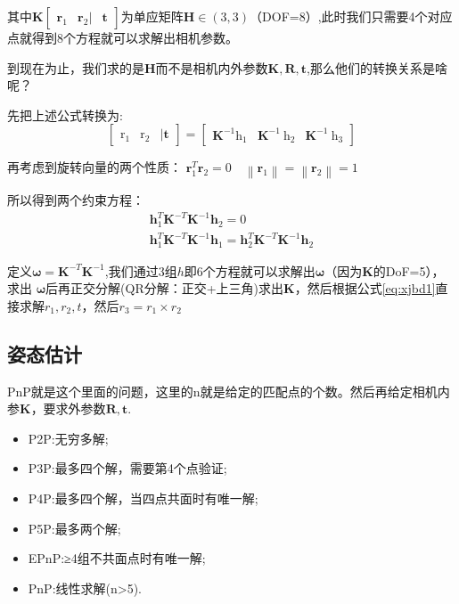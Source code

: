 \documentclass[12pt]{article}
\begin{document}
其中$\mathbf{K}\left[\begin{array}{lll}
    \mathbf{r}_{1} & \mathbf{r}_{2}| & \mathbf{t}
    \end{array}\right]$为单应矩阵$\mathbf{H}\in(3,3)$（DOF=8）,此时我们只需要4个对应点就得到8个方程就可以求解出相机参数。

到现在为止，我们求的是$\mathbf{H}$而不是相机内外参数$\mathbf{K,R,t}$,那么他们的转换关系是啥呢？

先把上述公式转换为:
\begin{equation}
    \label{eq:xjbd1}
    \left[\begin{array}{lll}
        \mathrm{r}_{1} & \mathrm{r}_{2} & \mid \mathbf{t}
        \end{array}\right]=\left[\begin{array}{lll}
        \mathbf{K}^{-1}\mathrm{h}_{1} & \mathbf{K}^{-1}\mathrm{~h}_{2} & \mathbf{K}^{-1}\mathrm{~h}_{3}
        \end{array}\right]
\end{equation}


再考虑到旋转向量的两个性质：
$\mathbf{r}_{1}^{T} \mathbf{r}_{2}=0 \quad\left\|\mathbf{r}_{1}\right\|=\left\|\mathbf{r}_{2}\right\|=1$

所以得到两个约束方程：
\begin{equation}
    \nonumber
    \begin{array}{c}
        \mathbf{h}_{1}^{T} \mathbf{K}^{-T} \mathbf{K}^{-1} \mathbf{h}_{2}=0 \\
        \mathbf{h}_{1}^{T} \mathbf{K}^{-T} \mathbf{K}^{-1} \mathbf{h}_{1}=\mathbf{h}_{2}^{T} \mathbf{K}^{-T} \mathbf{K}^{-1} \mathbf{h}_{2}
        \end{array}
\end{equation}

定义$\boldsymbol{\omega}=\mathbf{K}^{-T} \mathbf{K}^{-1}$,我们通过3组$h$即6个方程就可以求解出$\boldsymbol{\omega}$（因为$\mathbf{K}$的DoF=5），求出
$\boldsymbol{\omega}$后再正交分解(QR分解：正交+上三角)求出$\mathbf{K}$，然后根据公式\ref{eq:xjbd1}直接求解$r_1,r_2,t$，然后$r_3=r_1\times r_2$
\subsection{姿态估计}
PnP就是这个里面的问题，这里的n就是给定的匹配点的个数。然后再给定相机内参$\mathbf{K}$，要求外参数$\mathbf{R,t}$.
\begin{itemize}
    \item P2P:无穷多解;
    \item P3P:最多四个解，需要第4个点验证;
    \item P4P:最多四个解，当四点共面时有唯一解;
    \item P5P:最多两个解;
    \item EPnP:≥4组不共面点时有唯一解;
    \item PnP:线性求解(n>5).
\end{itemize}
\end{document}

